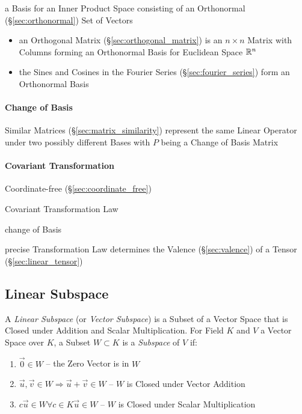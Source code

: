 a Basis for an Inner Product Space consisting of an Orthonormal
(\S\ref{sec:orthonormal}) Set of Vectors

\begin{itemize}
  \item an Orthogonal Matrix (\S\ref{sec:orthogonal_matrix}) is an $n \times n$
    Matrix with Columns forming an Orthonormal Basis for Euclidean Space
    $\mathbb{R}^n$
  \item the Sines and Cosines in the Fourier Series
    (\S\ref{sec:fourier_series}) form an Orthonormal Basis
\end{itemize}



\paragraph{Change of Basis}\label{sec:change_of_basis}\hfill

Similar Matrices (\S\ref{sec:matrix_similarity}) represent the same Linear
Operator under two possibly different Bases with $P$ being a Change of Basis
Matrix



\paragraph{Covariant Transformation}\label{sec:covariant_transformation}\hfill

Coordinate-free (\S\ref{sec:coordinate_free})

Covariant Transformation Law

change of Basis

precise Transformation Law determines the Valence
(\S\ref{sec:valence}) of a Tensor (\S\ref{sec:linear_tensor})



\subsection{Linear Subspace}\label{sec:linear_subspace}

A \emph{Linear Subspace} (or \emph{Vector Subspace}) is a Subset of a Vector
Space that is Closed under Addition and Scalar Multiplication. For Field $K$
and $V$ a Vector Space over $K$, a Subset $W \subset K$ is a \emph{Subspace} of
$V$ if:
\begin{enumerate}
  \item $\vec{0} \in W$ -- the Zero Vector is in $W$
  \item $\vec{u}, \vec{v} \in W \Rightarrow \vec{u} + \vec{v} \in W$
    -- $W$ is Closed under Vector Addition
  \item $c\vec{u} \in W \forall c \in K \vec{u} \in W$
    -- $W$ is Closed under Scalar Multiplication
\end{enumerate}

